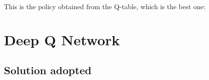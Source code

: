 \documentclass{article}
\begin{document}
This is the policy obtained from the Q-table, which is the best one:
\begin{center}
    \centering
\end{center}
    

\section{Deep Q Network}

\subsection{Solution adopted}
\end{document}
